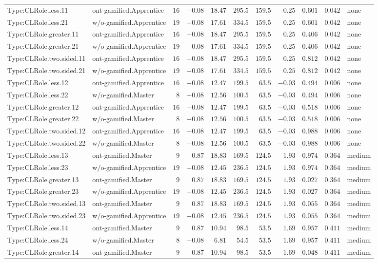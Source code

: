 \documentclass[6pt,a4paper]{article}
\begin{document}
{\begin{longtable}{llrrrrrrrrl}
Type:CLRole.less.11&ont-gamified.Apprentice&$16$&$-0.08$&$18.47$&$295.5$&$159.5$&$ 0.25$&$0.601$&$0.042$&none\tabularnewline
Type:CLRole.less.21&w/o-gamified.Apprentice&$19$&$-0.08$&$17.61$&$334.5$&$159.5$&$ 0.25$&$0.601$&$0.042$&none\tabularnewline
Type:CLRole.greater.11&ont-gamified.Apprentice&$16$&$-0.08$&$18.47$&$295.5$&$159.5$&$ 0.25$&$0.406$&$0.042$&none\tabularnewline
Type:CLRole.greater.21&w/o-gamified.Apprentice&$19$&$-0.08$&$17.61$&$334.5$&$159.5$&$ 0.25$&$0.406$&$0.042$&none\tabularnewline
Type:CLRole.two.sided.11&ont-gamified.Apprentice&$16$&$-0.08$&$18.47$&$295.5$&$159.5$&$ 0.25$&$0.812$&$0.042$&none\tabularnewline
Type:CLRole.two.sided.21&w/o-gamified.Apprentice&$19$&$-0.08$&$17.61$&$334.5$&$159.5$&$ 0.25$&$0.812$&$0.042$&none\tabularnewline
Type:CLRole.less.12&ont-gamified.Apprentice&$16$&$-0.08$&$12.47$&$199.5$&$ 63.5$&$-0.03$&$0.494$&$0.006$&none\tabularnewline
Type:CLRole.less.22&w/o-gamified.Master&$ 8$&$-0.08$&$12.56$&$100.5$&$ 63.5$&$-0.03$&$0.494$&$0.006$&none\tabularnewline
Type:CLRole.greater.12&ont-gamified.Apprentice&$16$&$-0.08$&$12.47$&$199.5$&$ 63.5$&$-0.03$&$0.518$&$0.006$&none\tabularnewline
Type:CLRole.greater.22&w/o-gamified.Master&$ 8$&$-0.08$&$12.56$&$100.5$&$ 63.5$&$-0.03$&$0.518$&$0.006$&none\tabularnewline
Type:CLRole.two.sided.12&ont-gamified.Apprentice&$16$&$-0.08$&$12.47$&$199.5$&$ 63.5$&$-0.03$&$0.988$&$0.006$&none\tabularnewline
Type:CLRole.two.sided.22&w/o-gamified.Master&$ 8$&$-0.08$&$12.56$&$100.5$&$ 63.5$&$-0.03$&$0.988$&$0.006$&none\tabularnewline
Type:CLRole.less.13&ont-gamified.Master&$ 9$&$ 0.87$&$18.83$&$169.5$&$124.5$&$ 1.93$&$0.974$&$0.364$&medium\tabularnewline
Type:CLRole.less.23&w/o-gamified.Apprentice&$19$&$-0.08$&$12.45$&$236.5$&$124.5$&$ 1.93$&$0.974$&$0.364$&medium\tabularnewline
Type:CLRole.greater.13&ont-gamified.Master&$ 9$&$ 0.87$&$18.83$&$169.5$&$124.5$&$ 1.93$&$0.027$&$0.364$&medium\tabularnewline
Type:CLRole.greater.23&w/o-gamified.Apprentice&$19$&$-0.08$&$12.45$&$236.5$&$124.5$&$ 1.93$&$0.027$&$0.364$&medium\tabularnewline
Type:CLRole.two.sided.13&ont-gamified.Master&$ 9$&$ 0.87$&$18.83$&$169.5$&$124.5$&$ 1.93$&$0.055$&$0.364$&medium\tabularnewline
Type:CLRole.two.sided.23&w/o-gamified.Apprentice&$19$&$-0.08$&$12.45$&$236.5$&$124.5$&$ 1.93$&$0.055$&$0.364$&medium\tabularnewline
Type:CLRole.less.14&ont-gamified.Master&$ 9$&$ 0.87$&$10.94$&$ 98.5$&$ 53.5$&$ 1.69$&$0.957$&$0.411$&medium\tabularnewline
Type:CLRole.less.24&w/o-gamified.Master&$ 8$&$-0.08$&$ 6.81$&$ 54.5$&$ 53.5$&$ 1.69$&$0.957$&$0.411$&medium\tabularnewline
Type:CLRole.greater.14&ont-gamified.Master&$ 9$&$ 0.87$&$10.94$&$ 98.5$&$ 53.5$&$ 1.69$&$0.048$&$0.411$&medium\tabularnewline

\end{longtable}}
\end{document}
